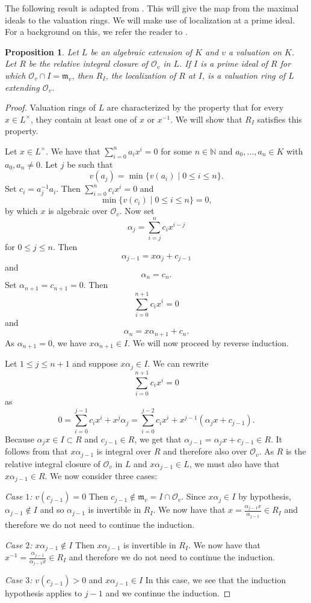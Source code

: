 \documentclass[12pt,a4paper]{amsart}
\newtheorem{prop}[thm]{Proposition}
\theoremstyle{definition}
\begin{document}
The following result is adapted from \cite[Theorem III.1.2]{Fuchs2001}.
This will give the map from the maximal ideals to the valuation rings.
We will make use of localization at a prime ideal.
For a background on this, we refer the reader to \cite[Section 15.4]{dummit2004}.
\begin{prop}{\label{loc}}
Let $L$ be an algebraic extension of $K$ and $v$ a valuation on $K$.
Let $R$ be the relative integral closure of $\mathcal{O}_v$ in $L$.
If $I$ is a prime ideal of $R$ for which $\mathcal{O}_v\cap I=\mathfrak{m}_v$,
then $R_I$, the localization of $R$ at $I$, is a valuation ring of $L$ extending $\mathcal{O}_v$.
\end{prop}
\begin{proof}
Valuation rings of $L$ are characterized by the property that for every $x\in L^{\times}$, they contain at least one of $x$ or $x^{-1}$.
We will show that $R_I$ satisfies this property.

Let $x\in L^{\times}$.
We have that $\sum_{i=0}^na_ix^i=0$ for some $n\in\mathds{N}$ and $a_0,\ldots,a_n\in K$ with $a_0,a_n\neq0$.
Let $j$ be such that $$v(a_j)=\min\{v(a_i)\mid0\leq i\leq n\}.$$ Set $c_i=a_j^{-1}a_i$.
Then $\sum_{i=0}^nc_ix^i=0$ and $$\min\{v(c_i)\mid0\leq i\leq n\}=0,$$ by which $x$ is algebraic over $\mathcal{O}_v$.
Now set $$\alpha_j=\sum_{i=j}^{n}c_ix^{i-j}$$
for $0\leq j\leq n$. Then $$\alpha_{j-1}=x\alpha_j+c_{j-1}$$ and $$\alpha_{n}=c_{n}.$$
Set $\alpha_{n+1}=c_{n+1}=0$. Then $$\sum_{i=0}^{n+1}c_ix^i=0$$ and $$\alpha_{n}=x\alpha_{n+1}+c_{n}.$$
As $\alpha_{n+1}=0$, we have $x\alpha_{n+1}\in I$.
We will now proceed by reverse induction.

Let $1\leq j\leq n+1$ and suppose $x\alpha_j\in I$.
We can rewrite $$\sum_{i=0}^{n+1}c_ix^i=0$$
as
$$0=\sum_{i=0}^{j-1}c_ix^i+x^j\alpha_j=\sum_{i=0}^{j-2}c_ix^i+x^{j-1}(\alpha_jx+c_{j-1}).$$
Because $\alpha_jx\in I\subset R$ and $c_{j-1}\in R$, we get that $\alpha_{j-1}=\alpha_jx+c_{j-1}\in R$.
It follows from  that $x\alpha_{j-1}$ is integral over $R$ and therefore also over $\mathcal{O}_v$.
As $R$ is the relative integral closure of $\mathcal{O}_v$ in $L$ and $x\alpha_{j-1}\in L$, we must also have that $x\alpha_{j-1}\in R$.
We now consider three cases:\par
\textit{Case $1$:} $v(c_{j-1})=0$\newline
Then $c_{j-1}\notin \mathfrak{m}_v=I\cap \mathcal{O}_v$.
Since $x\alpha_j\in I$ by hypothesis, $\alpha_{j-1}\notin I$ and so $\alpha_{j-1}$ is invertible in $R_I$.
We now have that $x=\frac{\alpha_{j-1}x}{\alpha_{j-1}}\in R_I$ and therefore we do not need to continue the induction.\par
\textit{Case $2$:} $x\alpha_{j-1}\notin I$\newline
Then $x\alpha_{j-1}$ is invertible in $R_I$.
We now have that $x^{-1}=\frac{\alpha_{j-1}}{\alpha_{j-1}x}\in R_I$ and therefore we do not need to continue the induction.\par
\textit{Case $3$:} $v(c_{j-1})>0$ and $x\alpha_{j-1}\in I$\newline
In this case, we see that the induction hypothesis applies to $j-1$ and we continue the induction.


\end{proof}
\end{document}
